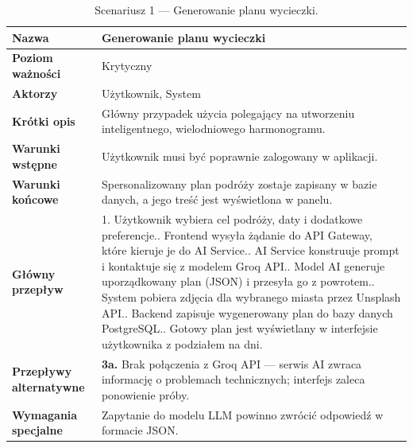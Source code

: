 \documentclass[11pt,a4paper]{article}
\begin{document}
\begin{table}[ht]
\small
\renewcommand{\arraystretch}{1.2}
\begin{tabularx}{\textwidth}{|>{\bfseries}p{}|Y|}
\hline
Nazwa & Generowanie planu wycieczki \\ \hline
Poziom ważności & Krytyczny \\ \hline
Aktorzy & Użytkownik, System \\ \hline
Krótki opis & Główny przypadek użycia polegający na utworzeniu inteligentnego, wielodniowego harmonogramu. \\ \hline
Warunki wstępne & Użytkownik musi być poprawnie zalogowany w aplikacji. \\ \hline
Warunki końcowe & Spersonalizowany plan podróży zostaje zapisany w bazie danych, a jego treść jest wyświetlona w panelu. \\ \hline
Główny przepływ & 1. Użytkownik wybiera cel podróży, daty i dodatkowe preferencje.. Frontend wysyła żądanie do API Gateway, które kieruje je do AI Service.. AI Service konstruuje prompt i kontaktuje się z modelem Groq API.. Model AI generuje uporządkowany plan (JSON) i przesyła go z powrotem.. System pobiera zdjęcia dla wybranego miasta przez Unsplash API.. Backend zapisuje wygenerowany plan do bazy danych PostgreSQL.. Gotowy plan jest wyświetlany w interfejsie użytkownika z podziałem na dni. \\ \hline
Przepływy alternatywne & \textbf{3a.} Brak połączenia z Groq API — serwis AI zwraca informację o problemach technicznych; interfejs zaleca ponowienie próby. \\ \hline
Wymagania specjalne & Zapytanie do modelu LLM powinno zwrócić odpowiedź w formacie JSON. \\ \hline
\end{tabularx}
\caption{Scenariusz 1 — Generowanie planu wycieczki.}
\end{table}
\FloatBarrier

\end{document}
